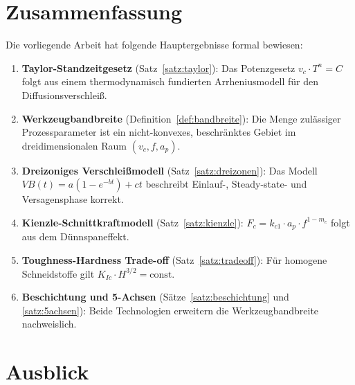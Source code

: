 ﻿\documentclass[a4paper,12pt]{article}
\theoremstyle{definition}
\begin{document}
\section{Zusammenfassung}
\label{sec:zusammenfassung}

Die vorliegende Arbeit hat folgende Hauptergebnisse formal bewiesen:

\begin{enumerate}
  \item \textbf{Taylor-Standzeitgesetz} (Satz~\ref{satz:taylor}): Das Potenzgesetz
        $v_c \cdot T^n = C$ folgt aus einem thermodynamisch fundierten
        Arrheniusmodell für den Diffusionsverschleiß.
  \item \textbf{Werkzeugbandbreite} (Definition~\ref{def:bandbreite}): Die Menge
        zulässiger Prozessparameter ist ein nicht-konvexes, beschränktes Gebiet
        im dreidimensionalen Raum $(v_c, f, a_p)$.
  \item \textbf{Dreizoniges Verschleißmodell} (Satz~\ref{satz:dreizonen}): Das
        Modell $VB(t) = a(1-e^{-bt}) + ct$ beschreibt Einlauf-, Steady-state-
        und Versagensphase korrekt.
  \item \textbf{Kienzle-Schnittkraftmodell} (Satz~\ref{satz:kienzle}): $F_c = k_{c1} \cdot a_p \cdot f^{1-m_c}$
        folgt aus dem Dünnspaneffekt.
  \item \textbf{Toughness-Hardness Trade-off} (Satz~\ref{satz:tradeoff}): Für
        homogene Schneidstoffe gilt $K_{Ic} \cdot H^{3/2} = \text{const.}$
  \item \textbf{Beschichtung und 5-Achsen} (Sätze~\ref{satz:beschichtung}
        und \ref{satz:5achsen}): Beide Technologien erweitern die
        Werkzeugbandbreite nachweislich.
\end{enumerate}

\section{Ausblick}
\label{sec:ausblick}
\end{document}
